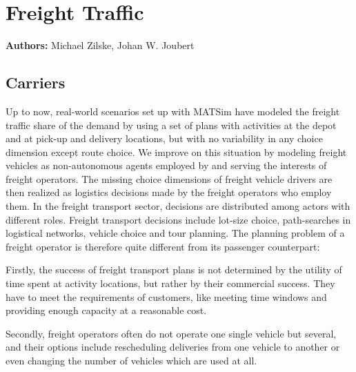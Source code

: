 \chapter{Freight Traffic}
\label{ch:freight}

\hfill \textbf{Authors:} Michael Zilske, Johan W. Joubert



\section{Carriers}
\label{sec:carriers}

Up to now, real-world scenarios set up with MATSim have modeled the freight traffic share of
the demand by using a set of plans with activities at the depot and at pick-up and delivery
locations, but with no variability in any choice dimension except route choice. We improve on
this situation by modeling freight vehicles as non-autonomous agents employed by and serving
the interests of freight operators. The missing choice dimensions of freight vehicle drivers are
then realized as logistics decisions made by the freight operators who employ them. In the
freight transport sector, decisions are distributed among actors with different roles. Freight
transport decisions include lot-size choice, path-searches in logistical networks, vehicle choice
and tour planning. The planning problem of a freight operator is therefore quite different from
its passenger counterpart:

Firstly, the success of freight transport plans is not determined by the utility of time
spent at activity locations, but rather by their commercial success. They have to meet the
requirements of customers, like meeting time windows and providing enough capacity at
a reasonable cost.

Secondly, freight operators often do not operate one single vehicle but several, and their
options include rescheduling deliveries from one vehicle to another or even changing the
number of vehicles which are used at all.

